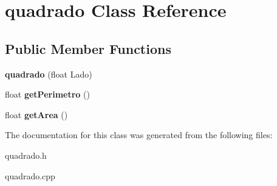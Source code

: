 \hypertarget{classquadrado}{}\section{quadrado Class Reference}
\label{classquadrado}
\subsection*{Public Member Functions}
\begin{DoxyCompactItemize}
\item 
\mbox{\label{classquadrado_a78da6b808ea4202775c7b7636f12fba3}} 
{\bfseries quadrado} (float Lado)
\item 
\mbox{\label{classquadrado_a2e56c1ddbf3605d533b0635e1f5b4de4}} 
float {\bfseries get\+Perimetro} ()
\item 
\mbox{\label{classquadrado_a1853ba2eb28b1926698f8d2a228cda78}} 
float {\bfseries get\+Area} ()
\end{DoxyCompactItemize}


The documentation for this class was generated from the following files\+:\begin{DoxyCompactItemize}
\item 
quadrado.\+h\item 
quadrado.\+cpp\end{DoxyCompactItemize}
